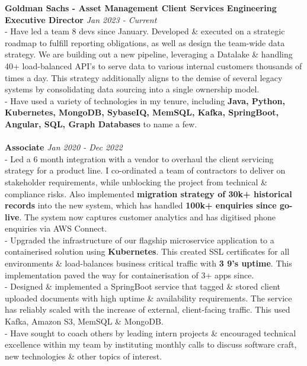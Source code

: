 \documentclass[a4paper,10pt]{article}
\begin{document}
	\textbf{Goldman Sachs - Asset Management Client Services Engineering}
		\\\textbf{Executive Director}  \hfill \textit{Jan 2023 - Current }
		\\ - Have led a team 8 devs since January. Developed \& executed on a strategic roadmap to fulfill reporting obligations, as well as design the team-wide data strategy. We are building out a new pipeline, leveraging a Datalake \& handling 40+ load-balanced API's to serve data to various internal customers thousands of times a day. This strategy additionally aligns to the demise of several legacy systems by consolidating data sourcing into a single ownership model.
		\\ - Have used a variety of technologies in my tenure, including \textbf{Java, Python, Kubernetes, MongoDB, SybaseIQ, MemSQL, Kafka, SpringBoot, Angular, SQL, Graph Databases} to name a few.
		\\\\
		\textbf{Associate}  \hfill \textit{Jan 2020 - Dec 2022}
		\\ - Led a 6 month integration with a vendor to overhaul the client servicing strategy for a product line. I co-ordinated a team of contractors to deliver on stakeholder requirements, while unblocking the project from technical \& compliance risks. Also implemented \textbf{migration strategy of 30k+ historical records} into the new system, which has handled \textbf{100k+ enquiries since go-live}. The system now captures customer analytics and has digitised phone enquiries via AWS Connect.
		\\ - Upgraded the infrastructure of our flagship microservice application to a containerised solution using \textbf{Kubernetes}. This created SSL certificates for all environments \& load-balances business critical traffic with \textbf{3 9's uptime}. This implementation paved the way for containerisation of 3+ apps since.
		\\ - Designed \& implemented a SpringBoot service that tagged \& stored client uploaded documents with high uptime \& availability requirements. The service has reliably scaled with the increase of external, client-facing traffic. This used Kafka, Amazon S3, MemSQL \& MongoDB.
		\\ - Have sought to coach others by leading intern projects \& encouraged technical excellence within my team by instituting monthly calls to discuss software craft,  new technologies \& other topics of interest.
		\\\\
\end{document}

